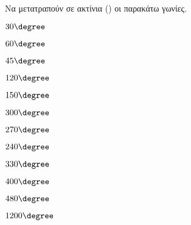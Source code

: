Να μετατραπούν σε ακτίνια () οι παρακάτω γωνίες.
\begin{multicols}{3}
\begin{alist}
\item $ 30\degree $
\item $ 60\degree $
\item $ 45\degree $
\item $ 120\degree $
\item $ 150\degree $
\item $ 300\degree $
\item $ 270\degree $
\item $ 240\degree $
\item $ 330\degree $
\item $ 400\degree $
\item $ 480\degree $
\item $ 1200\degree $
\end{alist}
\end{multicols}
